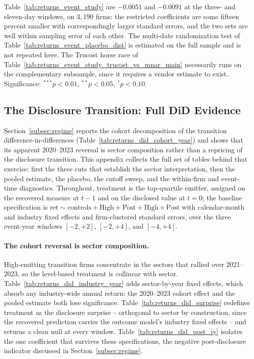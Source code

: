 \documentclass[a4paper,12pt]{article}
\begin{document}
\begin{table}[htbp]
\begin{flushleft}
Table~\ref{tab:returns_event_study} are $-0.0051$ and $-0.0091$ at the three- and
eleven-day windows, on $3{,}190$ firms: the restricted coefficients are some fifteen
percent smaller with correspondingly larger standard errors, and the two sets are
well within sampling error of each other. The multi-date randomization test of
Table~\ref{tab:returns_event_placebo_dist} is estimated on the full sample and is
not repeated here. The Trucost horse race of
Table~\ref{tab:returns_event_study_trucost_vs_mnar_main} necessarily runs on the
complementary subsample, since it requires a vendor estimate to exist.
Significance: $^{***}p<0.01$, $^{**}p<0.05$, $^{*}p<0.10$.
\end{flushleft}
\end{table}

\clearpage

\subsection{The Disclosure Transition: Full DiD Evidence}
\label{app:did}

Section~\ref{subsec:regime} reports the cohort decomposition of the transition
difference-in-differences (Table~\ref{tab:returns_did_cohort_year}) and shows that
its apparent 2020--2023 reversal is sector composition rather than a repricing of
the disclosure transition. This appendix collects the full set of tables behind that
exercise: first the three cuts that establish the sector interpretation, then the
pooled estimate, the placebo, the cutoff sweep, and the within-firm and event-time
diagnostics. Throughout, treatment is the top-quartile emitter, assigned on the
recovered measure at $t-1$ and on the disclosed value at $t=0$; the baseline
specification is $\mathrm{ret} \sim \text{controls} + \mathrm{High} + \mathrm{Post} +
\mathrm{High}\times\mathrm{Post}$ with calendar-month and industry fixed effects
and firm-clustered standard errors, over the three event-year windows $[-2,+2]$,
$[-2,+4]$, and $[-4,+4]$.

\paragraph{The cohort reversal is sector composition.} High-emitting transition
firms concentrate in the sectors that rallied over 2021--2023, so the level-based
treatment is collinear with sector. Table~\ref{tab:returns_did_industry_year} adds
sector-by-year fixed effects, which absorb any industry-wide annual return: the
2020--2023 cohort effect and the pooled estimate both lose significance.
Table~\ref{tab:returns_did_surprise} redefines treatment as the disclosure surprise
-- orthogonal to sector by construction, since the recovered prediction carries the
outcome model's industry fixed effects -- and returns a clean null at every window.
Table~\ref{tab:returns_did_post_iy} isolates the one coefficient that survives these
specifications, the negative post-disclosure indicator discussed in
Section~\ref{subsec:regime}.
\end{document}
